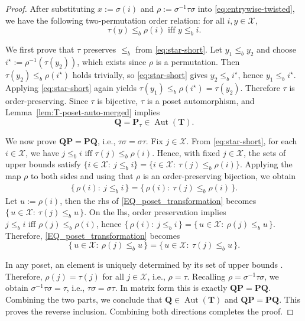 \documentclass[onecolumn]{IEEEtran} %
\newcommand{\1}{\mathbbm{1}}
\DeclareMathOperator{\Aut}{Aut}
\theoremstyle{boldremark}
\begin{document}
\begin{proof}
After substituting \(x:=\sigma(i)\) and \(\rho:=\sigma^{-1}\tau\sigma\) into \eqref{eq:entrywise-twisted},
we have the following two-permutation order relation: for all \(i,y\in\mathcal X\),
\begin{equation}\label{eq:star-short}
  \tau(y)\le_b \rho(i)
  \mbox{ iff }
  y\le_b i.
\end{equation}

We first prove that \(\tau\) preserves \(\le_b\) from \eqref{eq:star-short}. Let \(y_1\le_b y_2\) and choose \(i^\star:=\rho^{-1}(\tau(y_2))\), which exists since \(\rho\) is a permutation.
Then \(\tau(y_2)\le_b \rho(i^\star)\) holds trivially, so \eqref{eq:star-short} gives \(y_2\le_b i^\star\),
hence \(y_1\le_b i^\star\). Applying \eqref{eq:star-short} again yields
\(\tau(y_1)\le_b \rho(i^\star)=\tau(y_2)\).
Therefore \(\tau\) is order-preserving. Since \(\tau\) is bijective, \(\tau\) is a poset automorphism, and
Lemma~\ref{lem:T-poset-auto-merged} implies
\begin{equation}\label{eq:QinAutT}
\mathbf Q=\mathbf P_\tau\in\Aut(\mathbf T).
\end{equation}

We now prove \(\mathbf Q\mathbf P=\mathbf P\mathbf Q\), i.e., \(\tau\sigma=\sigma\tau\).
Fix \(j\in\mathcal X\). From \eqref{eq:star-short}, for each \(i\in\mathcal X\), we have
$j\le_b i\mbox{ iff }\tau(j)\le_b \rho(i).$ Hence, with fixed \(j\in\mathcal X\), the sets of upper bounds satisfy
$\{i\in\mathcal X:\ j\le_b i\}=\{i\in\mathcal X:\ \tau(j)\le_b \rho(i)\}.$
Applying the map \(\rho\) to both sides and using that \(\rho\) is an order-preserving bijection, we obtain
\begin{align}\label{EQ_poset_transformation}
    \{\,\rho(i):\ j\le_b i\,\}=\{\,\rho(i):\ \tau(j)\le_b \rho(i)\,\}.    
\end{align}
Let \(u:=\rho(i)\), then the \gls{rhs} of \eqref{EQ_poset_transformation} becomes
\(\{\,u\in\mathcal X:\ \tau(j)\le_b u\,\}\).
On the \gls{lhs}, order preservation implies
\(j\le_b i \mbox{ iff } \rho(j)\le_b \rho(i)\), hence
\(\{\,\rho(i):\ j\le_b i\,\}=\{\,u\in\mathcal X:\ \rho(j)\le_b u\,\}\).
Therefore, \eqref{EQ_poset_transformation} becomes
\begin{equation}\label{eq:upper2}
\{\,u\in\mathcal X:\ \rho(j)\le_b u\,\}
=
\{\,u\in\mathcal X:\ \tau(j)\le_b u\,\}.
\end{equation}


In any poset, an element is uniquely determined by its set of upper bounds \cite[Ch.~1]{DaveyPriestley2002}.
Therefore, \(\rho(j)=\tau(j)\) for all \(j\in\mathcal X\), i.e., \(\rho=\tau\).
Recalling \(\rho=\sigma^{-1}\tau\sigma\), we obtain \(\sigma^{-1}\tau\sigma=\tau\), i.e.,
\(\tau\sigma=\sigma\tau\). In matrix form this is exactly $\mathbf Q\mathbf P=\mathbf P\mathbf Q.$
Combining the two parts, we conclude that \(\mathbf Q\in\Aut(\mathbf T)\) and
\(\mathbf Q\mathbf P=\mathbf P\mathbf Q\). This proves the reverse inclusion. Combining both directions completes the proof.
\end{proof}
\end{document}
